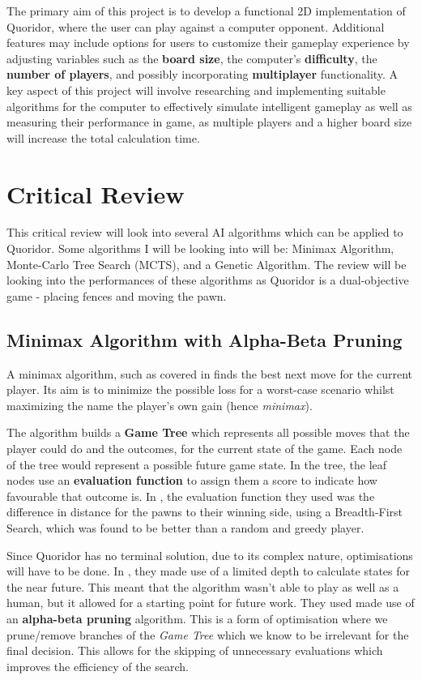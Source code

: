 \documentclass[review]{cmpreport}
\begin{document}
	\noindent The primary aim of this project is to develop a functional 2D implementation of Quoridor, where the user can play against a computer opponent. Additional features may include options for users to customize their gameplay experience by adjusting variables such as the \textbf{board size}, the computer's \textbf{difficulty}, the \textbf{number of players}, and possibly incorporating \textbf{multiplayer} functionality. A key aspect of this project will involve researching and implementing suitable algorithms for the computer to effectively simulate intelligent gameplay as well as measuring their performance in game, as multiple players and a higher board size will increase the total calculation time.
	
	\section{Critical Review}
	This critical review will look into several AI algorithms which can be applied to Quoridor. Some algorithms I will be looking into will be: Minimax Algorithm, Monte-Carlo Tree Search (MCTS), and a Genetic Algorithm. The review will be looking into the performances of these algorithms as Quoridor is a dual-objective game - placing fences and moving the pawn.
	
	\subsection{Minimax Algorithm with Alpha-Beta Pruning}
	A minimax algorithm, such as covered in \cite{plaat1996best} finds the best next move for the current player. Its aim is to minimize the possible loss for a worst-case scenario whilst maximizing the name the player's own gain (hence \textit{minimax}).
	
	\noindent The algorithm builds a \textbf{Game Tree} which represents all possible moves that the player could do and the outcomes, for the current state of the game. Each node of the tree would represent a possible future game state. In the tree, the leaf nodes use an \textbf{evaluation function} to assign them a score to indicate how favourable that outcome is. In \cite{josequoridor}, the evaluation function they used was the difference in distance for the pawns to their winning side, using a Breadth-First Search, which was found to be better than a random and greedy player.
	
	\noindent Since Quoridor has no terminal solution, due to its complex nature, optimisations will have to be done. In \cite{josequoridor}, they made use of a limited depth to calculate states for the near future. This meant that the algorithm wasn't able to play as well as a human, but it allowed for a starting point for future work. They used made use of an \textbf{alpha-beta pruning} algorithm. This is a form of optimisation where we prune/remove branches of the \textit{Game Tree} which we know to be irrelevant for the final decision. This allows for the skipping of unnecessary evaluations which improves the efficiency of the search.
	
\end{document}

